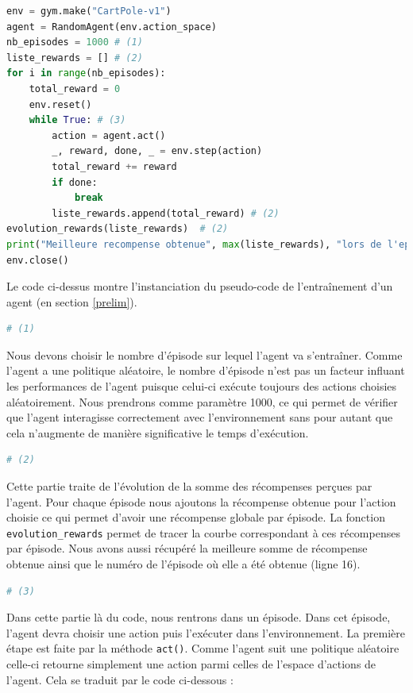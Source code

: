 \documentclass[10pt,a4paper]{article}
\begin{document}
\begin{lstlisting}[language=Python, caption=Programme principal de l'agent aléatoire]
env = gym.make("CartPole-v1")
agent = RandomAgent(env.action_space)
nb_episodes = 1000 # (1)
liste_rewards = [] # (2)
for i in range(nb_episodes): 
    total_reward = 0
    env.reset()
    while True: # (3)
        action = agent.act()
        _, reward, done, _ = env.step(action)
        total_reward += reward
        if done:
            break
        liste_rewards.append(total_reward) # (2)
evolution_rewards(liste_rewards)  # (2)
print("Meilleure recompense obtenue", max(liste_rewards), "lors de l'episode", liste_rewards.index(max(liste_rewards))) # (2)
env.close()

\end{lstlisting}

Le code ci-dessus montre l'instanciation du pseudo-code de l'entraînement d'un agent (en section \ref{prelim}).

\begin{lstlisting}[language=Python]
# (1)
\end{lstlisting}
Nous devons choisir le nombre d'épisode sur lequel l'agent va s'entraîner. Comme l'agent a une politique aléatoire, le nombre d'épisode n'est pas un facteur influant les performances de l'agent puisque celui-ci exécute toujours des actions choisies aléatoirement. Nous prendrons comme paramètre 1000, ce qui permet de vérifier que l'agent interagisse correctement avec l'environnement sans pour autant que cela n'augmente de manière significative le temps d'exécution.

\begin{lstlisting}[language=Python]
# (2)
\end{lstlisting}
Cette partie traite de l'évolution de la somme des récompenses perçues par l'agent. Pour chaque épisode nous ajoutons la récompense obtenue pour l'action choisie ce qui permet d'avoir une récompense \og globale \fg{}  par épisode. La fonction \lstinline{evolution_rewards} permet de tracer la courbe correspondant à ces récompenses par épisode. Nous avons aussi récupéré la meilleure somme de récompense obtenue ainsi que le numéro de l'épisode où elle a été obtenue (ligne 16).

\begin{lstlisting}[language=Python]
# (3)
\end{lstlisting}
Dans cette partie là du code, nous rentrons dans un épisode. Dans cet épisode, l'agent devra choisir une action puis l'exécuter dans l'environnement. La première étape est faite par la méthode \lstinline{act()}. Comme l'agent suit une politique aléatoire celle-ci retourne simplement une action parmi celles de l'espace d'actions de l'agent. Cela se traduit par le code ci-dessous :
\end{document}
